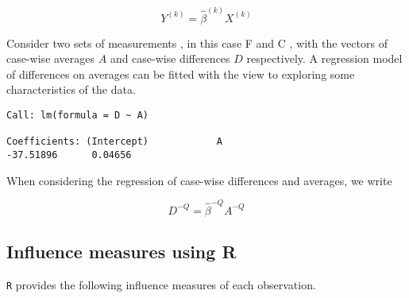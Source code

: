 \documentclass[12pt, a4paper]{report}
\theoremstyle{plain}
\theoremstyle{definition}
\theoremstyle{remark}
\begin{document}
\begin{equation}
Y^{(k)} = \hat{\beta}^{(k)}X^{(k)}
\end{equation}

Consider two sets of measurements , in this case F and C , with the vectors of case-wise averages $A$ and case-wise differences $D$ respectively. A regression model of differences on averages can be fitted with the view to exploring some characteristics of the data.

\begin{verbatim}
Call: lm(formula = D ~ A)

Coefficients: (Intercept)            A
-37.51896      0.04656

\end{verbatim}




When considering the regression of case-wise differences and averages, we write

\begin{equation}
D^{-Q} = \hat{\beta}^{-Q}A^{-Q}
\end{equation}



\subsection{Influence measures using R} %
\texttt{R} provides the following influence measures of each observation.

\end{document}
